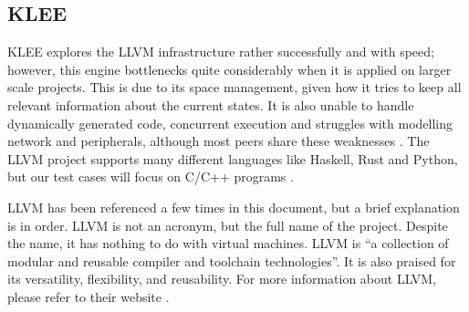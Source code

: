  

\subsection{KLEE}\label{section:klee}

KLEE explores the LLVM infrastructure rather successfully and with speed; however, this engine bottlenecks quite considerably when it is applied on larger scale projects. This is due to its space management, given how it tries to keep all relevant information about the current states. It is also unable to handle dynamically generated code, concurrent execution and struggles with modelling network and peripherals, although most peers share these weaknesses \cite{NSabinoSymbolicExecution}. The LLVM project supports many different languages like Haskell, Rust and Python, but our test cases will focus on C/C++ programs \cite{llvm}.

LLVM has been referenced a few times in this document, but a brief explanation is in order. LLVM is not an acronym, but the full name of the project. Despite the name, it has nothing to do with virtual machines. LLVM is ``a collection of modular and reusable compiler and toolchain technologies''. It is also praised for its versatility, flexibility, and reusability. For more information about LLVM, please refer to their website \cite{llvm}.




